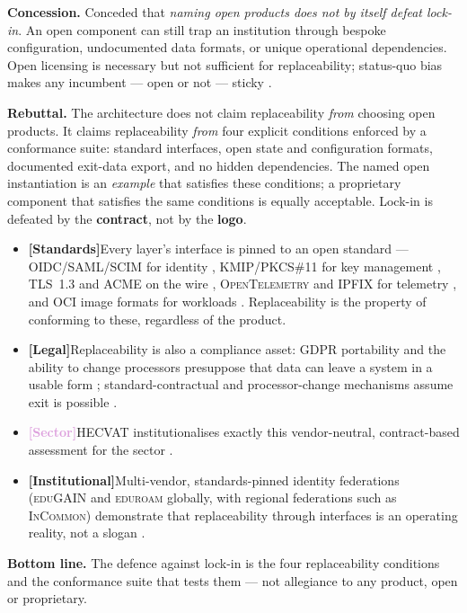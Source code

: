 \documentclass[11pt,a4paper,twoside]{book}
\let\citep\parencite
\newcommand{\keyword}[1]{\textbf{#1}}
\newcommand{\institution}[1]{\textsc{#1}}
\newcommand{\evlegal}{\textcolor{BrickRed}{\textbf{[Legal]}}\space}
\newcommand{\evstd}{\textcolor{NavyBlue}{\textbf{[Standards]}}\space}
\newcommand{\evsector}{\textcolor{Plum}{\textbf{[Sector]}}\space}
\newcommand{\evinst}{\textcolor{Slate}{\textbf{[Institutional]}}\space}
\begin{document}
\begin{answerbox}[Response O5.1]
\textbf{Concession.} Conceded that \emph{naming open products does not by
itself defeat lock-in}. An open component can still trap an institution
through bespoke configuration, undocumented data formats, or unique
operational dependencies. Open licensing is necessary but not sufficient for
replaceability; status-quo bias makes any incumbent --- open or not ---
sticky \citep{samuelson-zeckhauser}.

\medskip
\textbf{Rebuttal.} The architecture does not claim replaceability \emph{from}
choosing open products. It claims replaceability \emph{from} four explicit
conditions enforced by a conformance suite: standard interfaces, open
state and configuration formats, documented exit-data export, and no
hidden dependencies. The
named open instantiation is an \emph{example} that satisfies these
conditions; a proprietary component that satisfies the same conditions is
equally acceptable. Lock-in is defeated by the \keyword{contract}, not by the
\keyword{logo}.

\begin{itemize}[leftmargin=1.4em,itemsep=2pt]
  \item \evstd Every layer's interface is pinned to an open standard ---
        \institution{OIDC}/\institution{SAML}/\institution{SCIM} for identity
        \citep{oidc-core-1.0,saml-core-2.0,rfc-7643-scim-core},
        \institution{KMIP}/\institution{PKCS\#11} for key management
        \citep{kmip-oasis,pkcs11-oasis}, \institution{TLS}~1.3 and
        \institution{ACME} on the wire \citep{rfc-8446-tls13,rfc-8555-acme},
        \institution{OpenTelemetry} and \institution{IPFIX} for telemetry
        \citep{opentelemetry-spec,rfc-7011-ipfix}, and
        \institution{OCI} image formats for workloads \citep{oci-image-spec}.
        Replaceability is the property of conforming to these, regardless of
        the product.
  \item \evlegal Replaceability is also a compliance asset: \institution{GDPR}
        portability and the ability to change processors presuppose that data
        can leave a system in a usable form \citep{gdpr}; standard-contractual
        and processor-change mechanisms assume exit is possible
        \citep{eu-sccs2021}.
  \item \evsector \institution{HECVAT} institutionalises exactly this
        vendor-neutral, contract-based assessment for the sector
        \citep{hecvat}.
  \item \evinst Multi-vendor, standards-pinned identity federations
        (\institution{eduGAIN} and \institution{eduroam} globally, with regional
        federations such as \institution{InCommon})
        demonstrate that replaceability through interfaces is an operating
        reality, not a slogan \citep{edugain,incommon,eduroam}.
\end{itemize}

\textbf{Bottom line.} The defence against lock-in is the four replaceability
conditions and the conformance suite that tests them --- not allegiance to
any product, open or proprietary.
\end{answerbox}
\end{document}
